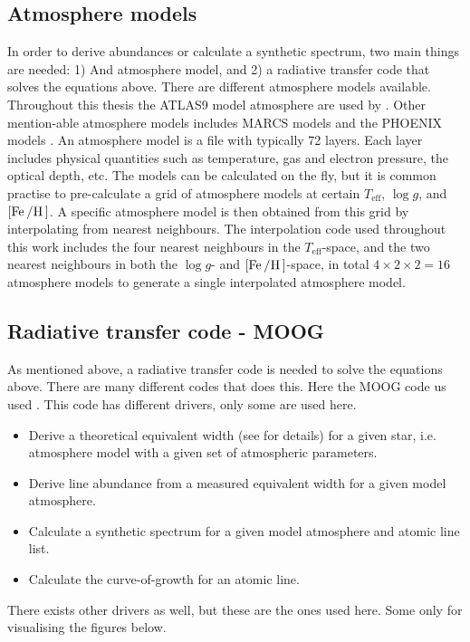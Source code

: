 \subsection{Atmosphere models}

In order to derive abundances or calculate a synthetic spectrum, two main things
are needed: 1) And atmosphere model, and 2) a radiative transfer code that
solves the equations above. There are different atmosphere models available.
Throughout this thesis the ATLAS9 model atmosphere are used by
\citet{Kurucz1993}. Other mention-able atmosphere models includes MARCS models
\citep{Gustafson2008} and the PHOENIX models \citep{Husser2013}. An atmosphere
model is a file with typically 72 layers. Each layer includes physical
quantities such as temperature, gas and electron pressure, the optical depth,
etc. The models can be calculated on the fly, but it is common practise to
pre-calculate a grid of atmosphere models at certain $T_\mathrm{eff}$, $\log g$,
and $[\ion{Fe}/\ion{H}]$. A specific atmosphere model is then obtained from this
grid by interpolating from nearest neighbours. The interpolation code used
throughout this work includes the four nearest neighbours in the
$T_\mathrm{eff}$-space, and the two nearest neighbours in both the $\log g$- and
$[\ion{Fe}/\ion{H}]$-space, in total $4\times2\times2=16$ atmosphere models to
generate a single interpolated atmosphere model.



\subsection{Radiative transfer code - MOOG}

As mentioned above, a radiative transfer code is needed to solve the equations
above. There are many different codes that does this. Here the MOOG code us used
\citep{Sneden1973}. This code has different drivers, only some are used here.

\begin{itemize}
  \item Derive a theoretical equivalent width (see  for details)
        for a given star, i.e. atmosphere model with a given set of atmospheric
        parameters.
  \item Derive line abundance from a measured equivalent width for a given model
        atmosphere.
  \item Calculate a synthetic spectrum for a given model atmosphere and atomic
        line list.
  \item Calculate the curve-of-growth for an atomic line.
\end{itemize}
There exists other drivers as well, but these are the ones used here. Some only
for visualising the figures below.



